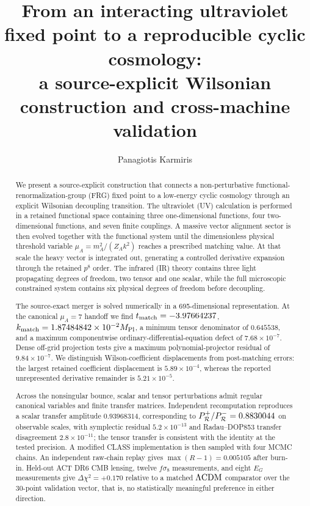 \documentclass[12pt]{iopart}
\newcommand{\mpl}{M_{\rm Pl}}
\newcommand{\LCDM}{\Lambda{\rm CDM}}
\begin{document}
\title{From an interacting ultraviolet fixed point to a reproducible cyclic cosmology:\\
a source-explicit Wilsonian construction and cross-machine validation}

\author{Panagiotis Karmiris}
\address{Independent Researcher, Greece}


\begin{abstract}
We present a source-explicit construction that connects a non-perturbative functional-renormalization-group (FRG) fixed point to a low-energy cyclic cosmology through an explicit Wilsonian decoupling transition.  The ultraviolet (UV) calculation is performed in a retained functional space containing three one-dimensional functions, four two-dimensional functions, and seven finite couplings.  A massive vector alignment sector is then evolved together with the functional system until the dimensionless physical threshold variable $\mu_A=m_A^2/(Z_A k^2)$ reaches a prescribed matching value.  At that scale the heavy vector is integrated out, generating a controlled derivative expansion through the retained $p^8$ order.  The infrared (IR) theory contains three light propagating degrees of freedom, two tensor and one scalar, while the full microscopic constrained system contains six physical degrees of freedom before decoupling.

The source-exact merger is solved numerically in a 695-dimensional representation.  At the canonical $\mu_A=7$ handoff we find $t_{\rm match}=-3.97664237$, $k_{\rm match}=1.87484842\times10^{-2}\mpl$, a minimum tensor denominator of $0.645538$, and a maximum componentwise ordinary-differential-equation defect of $7.68\times10^{-7}$.  Dense off-grid projection tests give a maximum polynomial-projector residual of $9.84\times10^{-7}$.  We distinguish Wilson-coefficient displacements from post-matching errors: the largest retained coefficient displacement is $5.89\times10^{-4}$, whereas the reported unrepresented derivative remainder is $5.21\times10^{-5}$.

Across the nonsingular bounce, scalar and tensor perturbations admit regular canonical variables and finite transfer matrices.  Independent recomputation reproduces a scalar transfer amplitude $0.93968314$, corresponding to $P_{\cal R}^{+}/P_{\cal R}^{-}=0.8830044$ on observable scales, with symplectic residual $5.2\times10^{-13}$ and Radau--DOP853 transfer disagreement $2.8\times10^{-11}$; the tensor transfer is consistent with the identity at the tested precision.  A modified CLASS implementation is then sampled with four MCMC chains.  An independent raw-chain replay gives $\max(R-1)=0.005105$ after burn-in.  Held-out ACT DR6 CMB lensing, twelve $f\sigma_8$ measurements, and eight $E_G$ measurements give $\Delta\chi^2=+0.170$ relative to a matched $\LCDM$ comparator over the 30-point validation vector, that is, no statistically meaningful preference in either direction.


\end{abstract}
\end{document}
